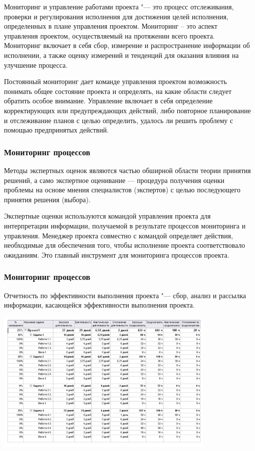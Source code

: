 \documentclass{../industrial-development}
\begin{document}
Мониторинг и управление работами проекта "--- это процесс отслеживания, проверки и регулирования исполнения для достижения целей исполнения, определенных в плане управления проектом. Мониторинг – это аспект управления проектом, осуществляемый на протяжении всего проекта. Мониторинг включает в себя сбор, измерение и распространение информации об исполнении, а также оценку измерений и тенденций для оказания влияния на улучшение процесса.

Постоянный мониторинг дает команде управления проектом возможность понимать общее состояние проекта и определять, на какие области следует обратить особое внимание. Управление включает в себя определение корректирующих или предупреждающих действий, либо повторное планирование и отслеживание планов с целью определить, удалось ли решить проблему с помощью предпринятых действий.

\begin{frame} \frametitle{Мониторинг процессов}
	\begin{definition}
		Методы экспертных оценок являются частью обширной области теории принятия решений, а само экспертное оценивание — процедура получения оценки проблемы на основе мнения специалистов (экспертов) с целью последующего принятия решения (выбора).
	\end{definition}
\end{frame}
\lecturenotes
    
Экспертные оценки используются командой управления проекта для интерпретации информации, получаемой в результате процессов мониторинга и управления. Менеджер проекта совместно с командой определяет действия, необходимые для обеспечения того, чтобы исполнение проекта соответствовало ожиданиям. Это главный инструмент для мониторинга процессов проекта.

\begin{frame} \frametitle{Мониторинг процессов}
	\begin{definition}
	Отчетность по эффективности выполнения проекта "--- сбор, анализ и рассылка информации, касающейся эффективности выполнения проекта.
	\end{definition}
	\centerline{\includegraphics[width=0.8\textwidth]{effect_chart.jpg}}
\end{frame}
\lecturenotes
\end{document}
